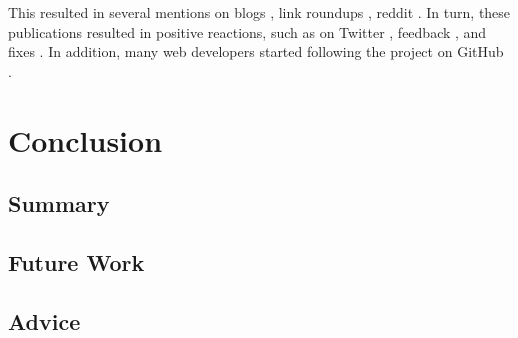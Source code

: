 This resulted in several mentions on blogs
\autocite{dailyjs.com-natural-language-parsing-retext}, link roundups
\autocites[e.g., ][]{github.com-awesome-machine-learning}
{github.com-awesome-nodejs}, reddit  \autocites[e.g., ][]
{reddit.com-mention-1}{reddit.com-mention-2}{reddit.com-mention-3}. In turn,
these publications resulted in positive reactions, such as on Twitter
\autocites{twitter.com-mention-1}{twitter.com-mention-2}
{twitter.com-mention-3}{twitter.com-mention-4}{twitter.com-mention-5},
feedback \autocites{github.com-issue-1}{github.com-issue-2}, and fixes
\autocite{github.com-pull-request}. In addition, many web developers started
following the project on GitHub \autocite{github.com-stargazers}.

\chapter{Conclusion}\label{conclusion}

\section{Summary}\label{summary}

\section{Future Work}\label{future-work}

\section{Advice}\label{advice}
